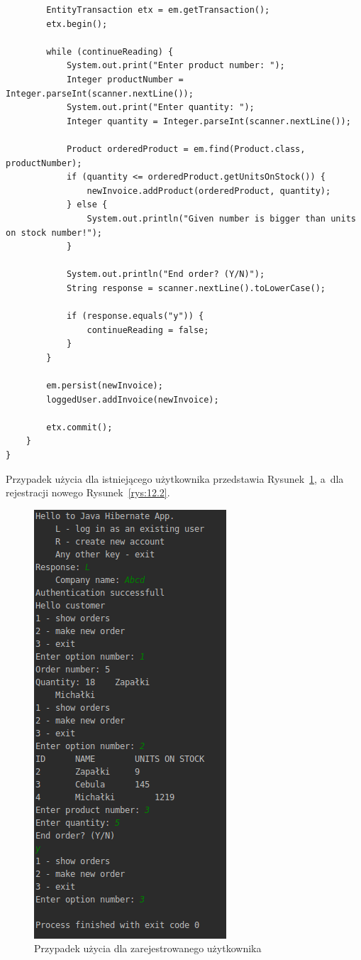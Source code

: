\documentclass[12pt, a4paper]{mwart}
\begin{document}
\begin{lstlisting}
        EntityTransaction etx = em.getTransaction();
        etx.begin();

        while (continueReading) {
            System.out.print("Enter product number: ");
            Integer productNumber = Integer.parseInt(scanner.nextLine());
            System.out.print("Enter quantity: ");
            Integer quantity = Integer.parseInt(scanner.nextLine());

            Product orderedProduct = em.find(Product.class, productNumber);
            if (quantity <= orderedProduct.getUnitsOnStock()) {
                newInvoice.addProduct(orderedProduct, quantity);
            } else {
                System.out.println("Given number is bigger than units on stock number!");
            }

            System.out.println("End order? (Y/N)");
            String response = scanner.nextLine().toLowerCase();

            if (response.equals("y")) {
                continueReading = false;
            }
        }

        em.persist(newInvoice);
        loggedUser.addInvoice(newInvoice);

        etx.commit();
    }
}
\end{lstlisting}

Przypadek użycia dla istniejącego użytkownika przedstawia Rysunek~\ref{rys:12.1}, a~dla rejestracji nowego Rysunek~\ref{rys:12.2}.

\begin{figure}[ht]
  \centering
  \includegraphics[scale=0.7]{XII/12-1.png}
  \caption{Przypadek użycia dla zarejestrowanego użytkownika}
  \label{rys:12.1}
\end{figure}
\end{document}
